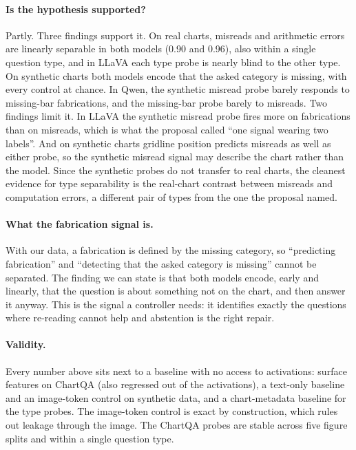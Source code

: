 \documentclass[11pt]{article}
\begin{document}
\paragraph{Is the hypothesis supported?} Partly. Three findings support it. On
real charts, misreads and arithmetic errors are linearly separable in both models
(0.90 and 0.96), also within a single question type, and in LLaVA each type
probe is nearly blind to the other type. On synthetic charts both models encode
that the asked category is missing, with every control at chance. In Qwen, the
synthetic misread probe barely responds to missing-bar fabrications, and the
missing-bar probe barely to misreads. Two findings limit it. In LLaVA the
synthetic misread probe fires more on fabrications than on misreads, which is
what the proposal called ``one signal wearing two labels''. And on synthetic
charts gridline position predicts misreads as well as either probe, so the
synthetic misread signal may describe the chart rather than the model. Since
the synthetic probes do not transfer to real charts, the cleanest evidence for
type separability is the real-chart contrast between misreads and computation
errors, a different pair of types from the one the proposal named.

\paragraph{What the fabrication signal is.} With our data, a fabrication is
defined by the missing category, so ``predicting fabrication'' and ``detecting
that the asked category is missing'' cannot be separated. The finding we can
state is that both models encode, early and linearly, that the question is about
something not on the chart, and then answer it anyway. This is the signal a
controller needs: it identifies exactly the questions where re-reading cannot
help and abstention is the right repair.

\paragraph{Validity.} Every number above sits next to a baseline with no access
to activations: surface features on ChartQA (also regressed out of the
activations), a text-only baseline and an image-token control on synthetic data,
and a chart-metadata baseline for the type probes. The image-token control is
exact by construction, which rules out leakage through the image. The ChartQA
probes are stable across five figure splits and within a single question type.
\end{document}
